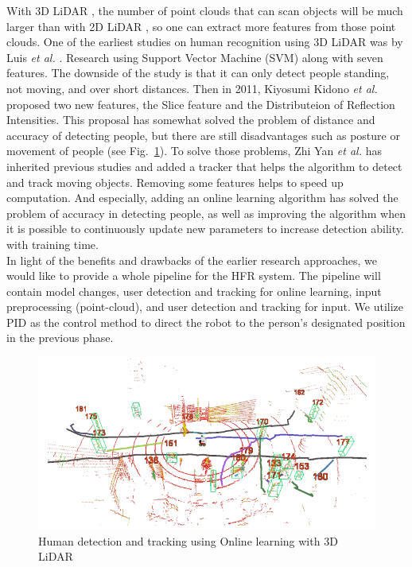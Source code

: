 With 3D LiDAR , the number of point clouds that can scan objects will be much larger than with 2D LiDAR , so one can extract more features from those point clouds. One of the earliest studies on human recognition using 3D LiDAR  was by Luis {\it et al.} \cite{narvano_2009}. Research using Support Vector Machine (SVM) along with seven features. The downside of the study is that it can only detect people standing, not moving, and over short distances. Then in 2011, Kiyosumi Kidono {\it et al.} \cite{kidono}proposed two new features, the Slice feature and the Distributeion of Reflection Intensities. This proposal has somewhat solved the problem of distance and accuracy of detecting people, but there are still disadvantages such as posture or movement of people (see Fig.~\ref{Chap2:Fig3}). To solve those problems, Zhi Yan {\it et al.} \cite{online_learning}has inherited previous studies and added a tracker that helps the algorithm to detect and track moving objects. Removing some features helps to speed up computation. And especially, adding an online learning algorithm has solved the problem of accuracy in detecting people, as well as improving the algorithm when it is possible to continuously update new parameters to increase detection ability. with training time.\\

In light of the benefits and drawbacks of the earlier research approaches, we would like to provide a whole pipeline for the HFR system. The pipeline will contain model changes, user detection and tracking for online learning, input preprocessing (point-cloud), and user detection and tracking for input. We utilize PID as the control method to direct the robot to the person's designated position in the previous phase.

\begin{figure}[h]
    \centering
    \includegraphics[scale=0.5]{figures/chap2_fig/online_learning.png}
    \caption{Human detection and tracking using Online learning with 3D LiDAR \cite{online_learning}}
    \label{Chap2:Fig3}
\end{figure}
